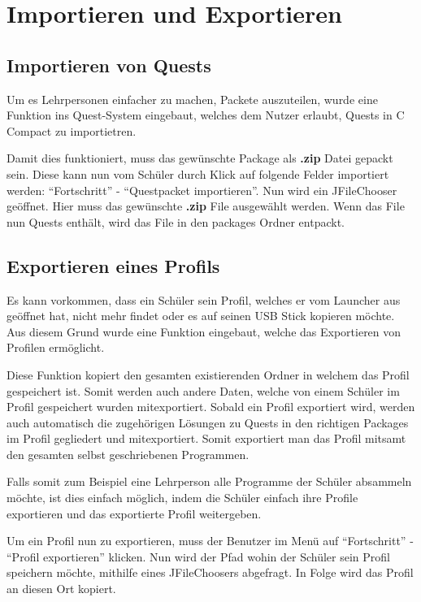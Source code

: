 \section{Importieren und Exportieren}
\subsection{Importieren von Quests}
\label{sec:quest-import}
Um es Lehrpersonen einfacher zu machen, Packete auszuteilen, wurde eine Funktion ins Quest-System eingebaut, welches dem Nutzer erlaubt, Quests in C Compact zu importietren.

Damit dies funktioniert, muss das gewünschte Package als \textbf{.zip} Datei gepackt sein. Diese kann nun vom Schüler durch Klick auf folgende Felder importiert werden: "`Fortschritt"' -  "`Questpacket importieren"'. Nun wird ein JFileChooser geöffnet. Hier muss das gewünschte \textbf{.zip} File ausgewählt werden. Wenn das File nun Quests enthält, wird das File in den packages Ordner entpackt.

\subsection{Exportieren eines Profils}
\label{sec:quest-export}
Es kann vorkommen, dass ein Schüler sein Profil, welches er vom Launcher aus geöffnet hat, nicht mehr findet oder es auf seinen USB Stick kopieren möchte. Aus diesem Grund wurde eine Funktion eingebaut, welche das Exportieren von Profilen ermöglicht.

Diese Funktion kopiert den gesamten existierenden Ordner in welchem das Profil gespeichert ist. Somit werden auch andere Daten, welche von einem Schüler im Profil gespeichert wurden mitexportiert. Sobald ein Profil exportiert wird, werden auch automatisch die zugehörigen Lösungen zu Quests in den richtigen Packages im Profil gegliedert und mitexportiert. Somit exportiert man das Profil mitsamt den gesamten selbst geschriebenen Programmen.

Falls somit zum Beispiel eine Lehrperson alle Programme der Schüler absammeln möchte, ist dies einfach möglich, indem die Schüler einfach ihre Profile exportieren und das exportierte Profil weitergeben.

Um ein Profil nun zu exportieren, muss der Benutzer im Menü auf "`Fortschritt"' - "`Profil exportieren"' klicken. Nun wird der Pfad wohin der Schüler sein Profil speichern möchte, mithilfe eines JFileChoosers abgefragt. In Folge wird das Profil an diesen Ort kopiert.
